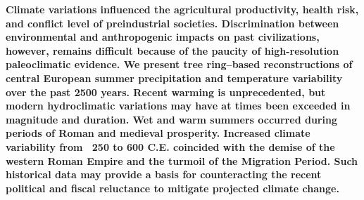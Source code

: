 \documentclass[10pt,a4paper,twoside,onecolumn]{article}
\begin{document}
\textbf{Climate variations influenced the agricultural productivity, health risk, and conflict level of preindustrial societies. Discrimination between environmental and anthropogenic impacts on past civilizations, however, remains difficult because of the paucity of high-resolution paleoclimatic evidence. We present tree ring–based reconstructions of central European summer precipitation
and temperature variability over the past 2500 years. Recent warming is unprecedented, but modern hydroclimatic variations may have at times been exceeded in magnitude and duration. Wet and warm summers occurred during periods of Roman and medieval prosperity. Increased climate variability from ~250 to 600 C.E. coincided with the demise of the western Roman Empire and the turmoil of the Migration Period. Such historical data may provide a basis for counteracting the recent political and fiscal reluctance to mitigate projected climate change.}
\end{document}
